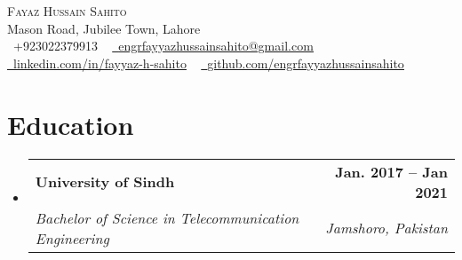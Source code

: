 \documentclass[letterpaper,11pt]{article}
\makeatletter
\newcommand{\resumeSubheading}[4]{
  \vspace{-2pt}\item
    \begin{tabular*}{1.0\textwidth}[t]{l@{\extracolsep{\fill}}r}
      \textbf{#1} & \textbf{\small #2} \\
      \textit{\small#3} & \textit{\small #4} \\
    \end{tabular*}\vspace{-7pt}
}
\newcommand{\resumeSubHeadingListStart}{\begin{itemize}[leftmargin=0.0in, label={}]}
\newcommand{\resumeSubHeadingListEnd}{\end{itemize}}
\makeatother
\begin{document}

\begin{center}
    {\Huge \scshape Fayaz Hussain Sahito} \\ \vspace{1pt}
    Mason Road, Jubilee Town, Lahore \\ \vspace{1pt}
    \small \raisebox{-0.1\height}\faPhone\ +923022379913 ~ \href{mailto:engrfayyazhussainsahito@gmail.com}{\raisebox{-0.2\height}\faEnvelope\  \underline{engrfayyazhussainsahito@gmail.com}} ~ 
    \href{https://linkedin.com/in//}{\raisebox{-0.2\height}\faLinkedin\ \underline{linkedin.com/in/fayyaz-h-sahito}}  ~
    \href{https://github.com/}{\raisebox{-0.2\height}\faGithub\ \underline{github.com/engrfayyazhussainsahito}}
    \vspace{-8pt}
\end{center}


\section{Education}
  \resumeSubHeadingListStart
    \resumeSubheading
      {University of Sindh}{Jan. 2017 -- Jan 2021}
      {Bachelor of Science in Telecommunication Engineering}{Jamshoro, Pakistan}
  \resumeSubHeadingListEnd

\end{document}
